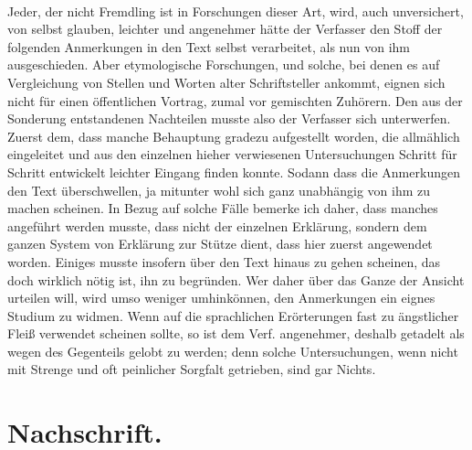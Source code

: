 \documentclass[a4paper, 11pt, oneside]{article}
\begin{document}
\paragraph{}
Jeder, der nicht Fremdling ist in Forschungen dieser Art, wird, auch unversichert, von selbst glauben, leichter und angenehmer hätte der Verfasser den Stoff der folgenden Anmerkungen in den Text selbst verarbeitet, als nun von ihm ausgeschieden. Aber etymologische Forschungen, und solche, bei denen es auf Vergleichung von Stellen und Worten alter Schriftsteller ankommt, eignen sich nicht für einen öffentlichen Vortrag, zumal vor gemischten Zuhörern. Den aus der Sonderung entstandenen Nachteilen musste also der Verfasser sich unterwerfen. Zuerst dem, dass manche Behauptung gradezu aufgestellt worden, die allmählich eingeleitet und aus den einzelnen hieher verwiesenen Untersuchungen Schritt für Schritt entwickelt leichter Eingang finden konnte. Sodann dass die Anmerkungen den Text überschwellen, ja mitunter wohl sich ganz unabhängig von ihm zu machen scheinen. In Bezug auf solche Fälle bemerke ich daher, dass manches angeführt werden musste, dass nicht der einzelnen Erklärung, sondern dem ganzen System von Erklärung zur Stütze dient, dass hier zuerst angewendet worden. Einiges musste insofern über den Text hinaus zu gehen scheinen, das doch wirklich nötig ist, ihn zu begründen. Wer daher über das Ganze der Ansicht urteilen will, wird umso weniger umhinkönnen, den Anmerkungen ein eignes Studium zu widmen. Wenn auf die sprachlichen Erörterungen fast zu ängstlicher Fleiß verwendet scheinen sollte, so ist dem Verf. angenehmer, deshalb getadelt als wegen des Gegenteils gelobt zu werden; denn solche Untersuchungen, wenn nicht mit Strenge und oft peinlicher Sorgfalt getrieben, sind gar Nichts.
\clearpage
\section{Nachschrift.}
\end{document}
